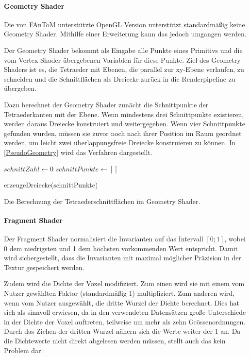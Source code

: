 \documentclass[a4paper,fontsize=12pt,toc=bib,halfparskip,ngerman]{scrartcl}
\begin{document}
\paragraph{Geometry Shader}
Die von FAnToM unterst\"utzte OpenGL Version unterst\"utzt standardm\"a{\ss}ig keine Geometry Shader. Mithilfe einer Erweiterung kann das jedoch umgangen werden.

Der Geometry Shader bekommt als Eingabe alle Punkte eines Primitivs und die vom Vertex Shader \"ubergebenen Variablen f\"ur diese Punkte. Ziel des Geometry Shaders ist es, die Tetraeder mit Ebenen, die parallel zur xy-Ebene verlaufen, zu schneiden und die Schnittfl\"achen als Dreiecke zur\"uck in die Renderpipeline zu \"ubergeben.

Dazu berechnet der Geometry Shader zun\"acht die Schnittpunkte der Tetraederkanten mit der Ebene. Wenn mindestens drei Schnittpunkte existieren, werden  daraus Dreiecke konstruiert und weitergegeben. Wenn vier Schnittpunkte gefunden wurden, m\"ussen sie zuvor noch nach ihrer Position im Raum geordnet werden, um leicht zwei \"uberlappungsfreie Dreiecke konstruieren zu k\"onnen. In \cref{PseudoGeometry} wird das Verfahren dargestellt.

\begin{algorithm}
	$schnittZahl \gets 0$\;
	$schnittPunkte \gets []$\;
	
	erzeugeDreiecke(schnittPunkte)\;
	\vspace{0.5cm}
	\caption{Die Berechnung der Tetraederschnittfl\"achen im Geometry Shader.}
	\label{PseudoGeometry}
\end{algorithm}

\paragraph{Fragment Shader}
Der Fragment Shader normalisiert die Invarianten auf das Intervall $[0;1]$, wobei 0 dem niedrigsten und 1 dem h\"ochsten vorkommenden Wert entspricht. Damit wird sichergestellt, dass die Invarianten mit maximal m\"oglicher Pr\"azision in der Textur gespeichert werden.

Zudem wird die Dichte der Voxel modifiziert. Zum einen wird sie mit einem vom Nutzer gew\"ahlten Faktor (standardm\"a{\ss}ig 1) multipliziert. Zum anderen wird, wenn vom Nutzer ausgew\"ahlt, die dritte Wurzel der Dichte berechnet. Dies hat sich als sinnvoll erwiesen, da in den verwendeten Datens\"atzen gro{\ss}e Unterschiede in der Dichte der Voxel auftreten, teilweise um mehr als zehn Gr\"o{ss}enordnungen. Durch das Ziehen der dritten Wurzel n\"ahern sich die Werte weiter der 1 an. Da die Dichtewerte nicht direkt abgelesen werden m\"ussen, stellt auch das kein Problem dar. 
\end{document}
